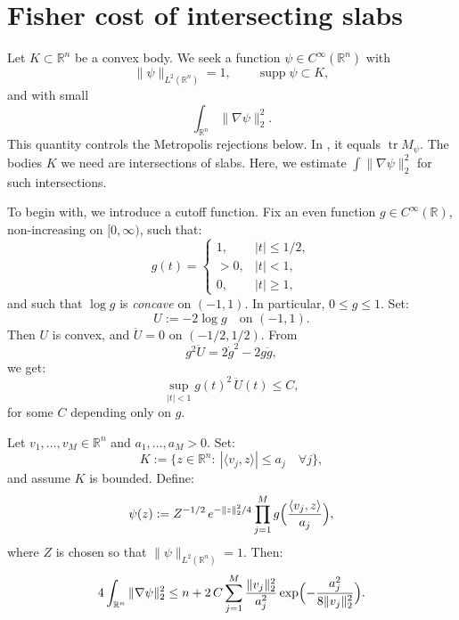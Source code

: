 \documentclass[12pt,reqno]{amsart}
\numberwithin{equation}{section}
\def \R {\mathbb{R}}
\begin{document}
\section{Fisher cost of intersecting slabs}\label{sec:slabs}

Let \(K\subset\R^n\) be a convex body. We seek a function \(\psi\in C^\infty(\R^n)\) with
\[
\|\psi\|_{L^2(\R^n)}=1,\qquad
\operatorname{supp}\psi\subset K,
\]
and with small
\[
\int_{\R^n}\|\nabla\psi\|_2^2.
\]
This quantity controls the Metropolis rejections below. In \cite{Versh-Sm-3}, it equals \(\operatorname{tr}M_\psi\). The bodies \(K\) we need are intersections of slabs. Here, we estimate \(\int\|\nabla\psi\|_2^2\) for such intersections.
\smallskip%

To begin with, we introduce a cutoff function. 
Fix an even function \(g\in C^\infty(\R)\), non-increasing on \([0,\infty)\), such that:
\[
g(t)=\begin{cases}
1, & |t|\le 1/2,\\
>0, & |t|<1,\\
0, & |t|\ge 1,
\end{cases}
\]
and such that \(\log g\) is \emph{concave} 
on \((-1,1)\). In particular, \(0\le g\le 1\). Set:
\[
U:=-2\log g\quad\text{on }(-1,1).
\]
Then \(U\) is convex, and \(\ddot U=0\) on \((-1/2,1/2)\). From
\[
g^2\ddot U=2\dot g^2-2g\ddot g,
\]
we get:
\begin{equation}\label{eq:gU}
\sup_{|t|<1}g(t)^2\,\ddot U(t)\le C,
\end{equation}
for some \(C\) depending only on \(g\).

\begin{proposition}\label{slabs}
Let \(v_1,\ldots,v_M\in\R^n\) and \(a_1,\ldots,a_M>0\). Set:
\[
K:=\bigl\{z\in\R^n:\ |\langle v_j,z\rangle|\le a_j\quad \forall j\bigr\},
\]
and assume \(K\) is bounded. Define:
\[
\psi(z):=Z^{-1/2}\,e^{-\|z\|_2^2/4}\prod_{j=1}^M
g\Bigl(\frac{\langle v_j,z\rangle}{a_j}\Bigr),
\]
where \(Z\) is chosen so that \(\|\psi\|_{L^2(\R^n)}=1\).
Then:
\begin{equation}\label{eq:slab-fisher}
4\int_{\R^n}\|\nabla\psi\|_2^2
\le
n+2\,C\sum_{j=1}^M\frac{\|v_j\|_2^2}{a_j^2}
\exp\Bigl(-\frac{a_j^2}{8\|v_j\|_2^2}\Bigr).
\end{equation}
\end{proposition}
\end{document}
